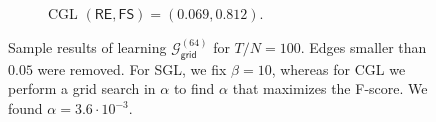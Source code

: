 \begin{figure}[!htb]
\begin{subfigure}[b]{0.3\textwidth}
        \caption{\textsf{CGL} $(\mathsf{RE}, \mathsf{FS}) = (0.069, 0.812)$.}
    \end{subfigure}
    \caption{Sample results of learning $\mathcal{G}^{(64)}_{\mathsf{grid}}$ for $T/N = 100$. Edges smaller than $0.05$ were removed.
    For \textsf{SGL}, we fix $\beta = 10$, whereas for \textsf{CGL} we perform a grid search in $\alpha$ to find $\alpha$ that maximizes the F-score.
    We found $\alpha = 3.6\cdot 10^{-3}$.}
    \label{fig:sample-grid}
\end{figure}
